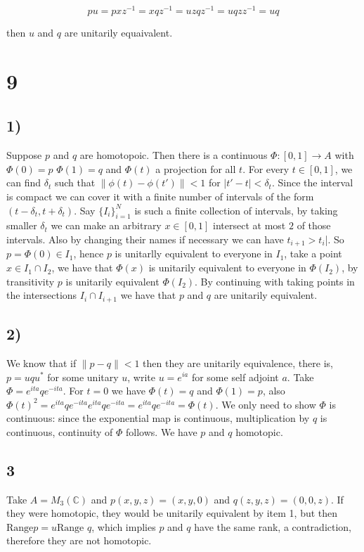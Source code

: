 \documentclass{article}
\begin{document}
\[pu=pxz^{-1}=xqz^{-1}=uzqz^{-1}=uqzz^{-1}=uq\]

then $u$ and $q$ are unitarily equaivalent. 




\section*{9}
\subsection*{1)}
Suppose $p$ and $q$ are homotopoic. Then there is a continuous $\Phi:[0,1]\to A$ with $\Phi(0)=p$
$\Phi(1)=q$ and $\Phi(t)$ a projection for all $t$. For every $t\in [0,1]$, we can find $\delta_t$
such that $\|\phi(t)-\phi(t')\|<1$ for $|t'-t|<\delta_t$. Since the interval is compact
we can cover it with a finite number of intervals of the form $(t-\delta_t,t+\delta_t)$. 
Say $\{I_i\}_{i=1}^{N}$ is such a finite collection of intervals, by taking smaller $\delta_t$
we can make an arbitrary $x\in [0,1]$ intersect at most $2$ of those intervals. Also by
changing their names if necessary we can have $t_{i+1}>t_i$|. So $p=\Phi(0)\in I_1$, hence
$p$ is unitarlly equivalent to everyone in $I_1$, take a point $x\in I_1\cap I_2$, we have 
that $\Phi(x)$ is unitarily equivalent to everyone in $\Phi(I_2)$, by transitivity $p$ is 
unitarily equivalent $\Phi(I_2)$. By continuing with taking points in the intersections 
$I_i\cap I_{i+1}$ we have that $p$ and $q$ are unitarily equivalent.  

\subsection*{2)}

We know that if $\|p-q\|<1$ then they are unitarily equivalence, there is, $p=uqu^\ast$ for 
some unitary $u$, write $u=e^{ia}$ for some self adjoint $a$. Take $\Phi=e^{ita}qe^{-ita}$.
For $t=0$ we have $\Phi(t)=q$ and $\Phi(1)=p$, also $\Phi(t)^2=e^{ita}qe^{-ita}e^{ita}qe^{-ita}=
e^{ita}qe^{-ita}=\Phi(t)$. We only need to show $\Phi$ is continuous: since the exponential
map is continuous, multiplication by $q$ is continuous, continuity of $\Phi$ follows. 
We have $p$ and $q$ homotopic.


\subsection*{3}

Take $A=M_3(\mathbb{C})$ and $p(x,y,z)=(x,y,0)$ and $q(z,y,z)=(0,0,z)$.
If they were homotopic, they would be unitarily equivalent by item 1, but
then $\text{Range} p=u \text{Range } q$, which implies $p$ and $q$ have the 
same rank, a contradiction, therefore they are not homotopic.
\end{document}
